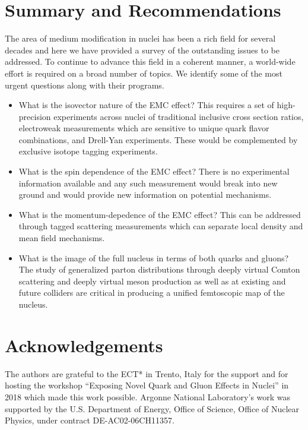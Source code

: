 \section{Summary and Recommendations}

The area of medium modification in nuclei has been a rich field for several decades and here we have provided a survey of the outstanding issues to be addressed.  To continue to advance this field in a coherent manner, a world-wide effort is required on a broad number of topics.  We identify some of the most urgent questions along with their programs.

\begin{itemize}
    \item{What is the isovector nature of the EMC effect?  This requires a set of high-precision experiments across nuclei of traditional inclusive cross section ratios, electroweak measurements which are sensitive to unique quark flavor combinations, and Drell-Yan experiments.  These would be complemented by exclusive isotope tagging experiments.}
    \item{What is the spin dependence of the EMC effect?  There is no experimental information available and any such measurement would break into new ground and would provide new information on potential mechanisms.}
    \item{What is the momentum-depedence of the EMC effect?  This can be addressed through tagged scattering measurements which can separate local density and mean field mechanisms.}
    \item{What is the image of the full nucleus in terms of both quarks and gluons?  The study of generalized parton distributions through deeply virtual Comton scattering and deeply virtual meson production as well as at existing and future colliders are critical in producing a unified femtoscopic map of the nucleus.}
\end{itemize}

\section{Acknowledgements}

The authors are grateful to the ECT* in Trento, Italy for the support and for hosting the workshop ``Exposing Novel Quark and Gluon Effects in Nuclei'' in 2018 which made this work possible.  Argonne National Laboratory's work was supported by the U.S. Department of Energy, Office of Science, Office of Nuclear Physics, under contract DE-AC02-06CH11357.  
